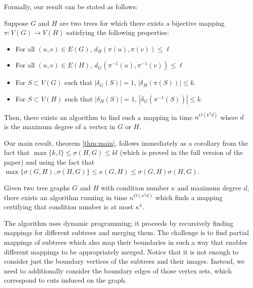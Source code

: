 Formally, our result can be stated as follows:

\begin{theorem}\label{thm:cuts_distances_algo} Suppose $G$ and $H$ are two trees 
  for which there exists a bijective mapping
  $\pi:V(G) \rightarrow V(H)$ satisfying the following properties:
  \begin{itemize}
  \item For all $(u,v) \in E(G)$, $d_H(\pi(u),\pi(v)) \leq \ell$
  \item For all $(u,v) \in E(H)$, $d_G(\pi^{-1}(u),\pi^{-1}(v)) \leq \ell$
  \item For $S \subset V(G)$ such that $|\delta_G(S)| = 1$, $|\delta_H(\pi(S))| \leq k$.
  \item For $S \subset V(H)$ such that $|\delta_H(S)| = 1$, $|\delta_G(\pi^{-1}(S))| \leq k$.
  \end{itemize}
  Then, there exists an algorithm to find such a mapping in time
  $n^{O(k^2d)}$ where $d$ is the maximum degree of a vertex in $G$ or
  $H$.
\end{theorem}

Our main result, theorem \ref{thm:main}, follows immediately as a corollary from the fact that
$\max\{k,l\} \leq \sigma(H,G) \leq kl$ (which is proved in the full version of the paper) and 
using the fact that $\max \{\sigma(G,H), \sigma(H,G) \} \leq \kappa(G,H) \leq \sigma(G,H) \sigma(H,G)$.



%
\begin{corollary}
  Given two tree graphs $G$ and $H$ with condition number $\kappa$ and maximum  degree $d$, there exists an algorithm running in time  $n^{O(\kappa^2d)}$ which finds a mapping certifying that condition
  number is at most $\kappa^4$.
\end{corollary}
%
The algorithm uses dynamic programming; it proceeds by recursively finding mappings for different subtrees and merging them. The challenge is to find partial mappings of subtrees which also map their boundaries in such a way that enables different mappings to be appropriately merged. Notice that it is not enough to consider just the boundary vertices of the subtrees and their images. Instead, we need to additionally consider the boundary edges of those vertex sets, which correspond to cuts induced on the graph. 

\medskip

